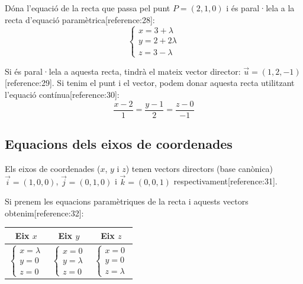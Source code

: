 \documentclass[12pt]{article}
\begin{document}
\begin{exemple}
Dóna l'equació de la recta que passa pel punt $P=(2,1,0)$ i és paral·lela a la recta d'equació paramètrica[reference:28]:
\[
\begin{cases}
x = 3 + \lambda \\
y = 2 + 2\lambda \\
z = 3 - \lambda
\end{cases}
\]

Si és paral·lela a aquesta recta, tindrà el mateix vector director: $\vec{u}=(1,2,-1)$[reference:29]. Si tenim el punt i el vector, podem donar aquesta recta utilitzant l'equació contínua[reference:30]:
\[
\frac{x-2}{1} = \frac{y-1}{2} = \frac{z-0}{-1}
\]
\end{exemple}

\subsection{Equacions dels eixos de coordenades}

\begin{concept}
Els eixos de coordenades ($x$, $y$ i $z$) tenen vectors directors (base canònica) $\vec{i}=(1,0,0)$, $\vec{j}=(0,1,0)$ i $\vec{k}=(0,0,1)$ respectivament[reference:31].

Si prenem les equacions paramètriques de la recta i aquests vectors obtenim[reference:32]:

\begin{center}
\begin{tabular}{|c|c|c|}
\hline
\textbf{Eix $x$} & \textbf{Eix $y$} & \textbf{Eix $z$} \\
\hline
$\begin{cases} x = \lambda \\ y = 0 \\ z = 0 \end{cases}$ &
$\begin{cases} x = 0 \\ y = \lambda \\ z = 0 \end{cases}$ &
$\begin{cases} x = 0 \\ y = 0 \\ z = \lambda \end{cases}$ \\
\hline
\end{tabular}
\end{center}
\end{concept}
\end{document}

